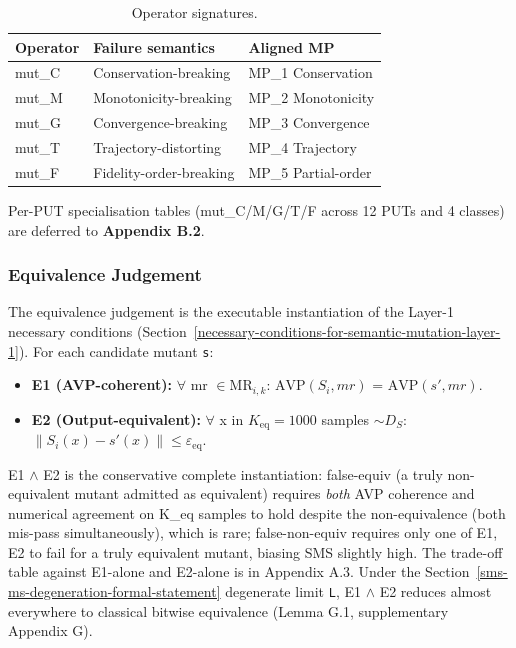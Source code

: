 \documentclass[manuscript,screen,review]{acmart}
\begin{document}
\begin{table}[t]
\caption{Operator signatures.}\label{tab:p2-01}
\centering
\begin{tabular}{@{}lll@{}}
\toprule
Operator & Failure semantics & Aligned MP \\
\midrule
mut\_C & Conservation-breaking & MP\_1 Conservation \\
mut\_M & Monotonicity-breaking & MP\_2 Monotonicity \\
mut\_G & Convergence-breaking & MP\_3 Convergence \\
mut\_T & Trajectory-distorting & MP\_4 Trajectory \\
mut\_F & Fidelity-order-breaking & MP\_5 Partial-order \\
\bottomrule
\end{tabular}
\end{table}

Per-PUT specialisation tables (mut\_C/M/G/T/F across 12 PUTs and 4
classes) are deferred to \textbf{Appendix B.2}.

\subsubsection{Equivalence Judgement}\label{equivalence-judgement-e1-e2-layer-2}

The equivalence judgement is the executable instantiation of the Layer-1
necessary conditions (Section~\ref{necessary-conditions-for-semantic-mutation-layer-1}). For each candidate mutant
\texttt{s\textquotesingle{}}:

\begin{itemize}

\item
  \textbf{E1 (AVP-coherent):} $\forall$ mr $\in \mathrm{MR}_{i,k}$: $\mathrm{AVP}(S_i, mr)$ =
  $\mathrm{AVP}(s', mr)$.
\item
  \textbf{E2 (Output-equivalent):} $\forall$ x in $K_{\mathrm{eq}}=1000$ samples
  $\sim D_S$: $\|S_i(x) - s'(x)\| \leq \varepsilon_{\mathrm{eq}}$.
\end{itemize}

E1 $\wedge$ E2 is the conservative complete instantiation: false-equiv (a
truly non-equivalent mutant admitted as equivalent) requires \emph{both}
AVP coherence and numerical agreement on K\_eq samples to hold despite the
non-equivalence (both mis-pass simultaneously), which is rare;
false-non-equiv requires only one of E1, E2 to fail for a truly equivalent
mutant, biasing SMS slightly high. The trade-off table against
E1-alone and E2-alone is in Appendix A.3. Under the Section~\ref{sms-ms-degeneration-formal-statement} degenerate
limit \texttt{L}, E1 $\wedge$ E2 reduces almost everywhere to classical bitwise
equivalence (Lemma G.1, supplementary Appendix G).
\end{document}

